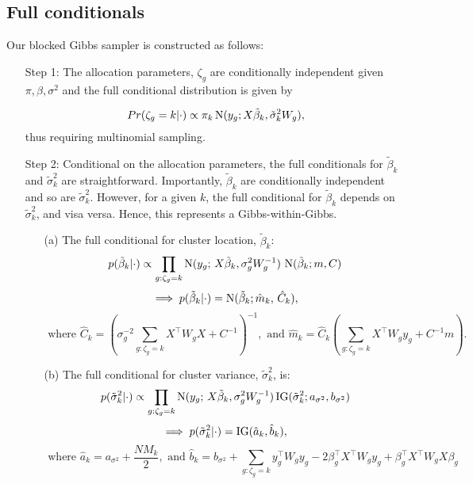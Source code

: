 \subsection{Full conditionals}
\label{subsec:full-cond}
Our blocked Gibbs sampler is constructed as follows:
\begin{enumerate}
\item[Step 1:]
The allocation parameters, $\zeta_g$ are conditionally independent given $\pi, \beta, \sigma^2$ and the full conditional distribution is given by

\begin{equation}
\label{zetafull}
Pr(\zeta_g=k|\cdot) \propto \pi_k \operatorname{N}(y_g;X\tilde{\beta}_k,\tilde{\sigma}_k^2 W_g),
\end{equation}
thus requiring multinomial sampling.

\item[Step 2:] Conditional on the allocation parameters, the full conditionals for $\tilde{\beta}_k$ and $\tilde{\sigma}^2_k$ are straightforward. Importantly, $\tilde{\beta}_k$ are conditionally independent and so are $\tilde{\sigma}^2_k$. However, for a given $k$, the full conditional for $\tilde{\beta}_k$ depends on $\tilde{\sigma}^2_k$, and visa versa. Hence, this represents a Gibbs-within-Gibbs.
  \begin{enumerate}
  \item[(a)] The full conditional for cluster location, $\tilde{\beta}_k$:
    \begin{equation}
      p(\tilde{\beta}_k|\cdot) \propto \prod_{g:\zeta_g=k} \operatorname{N}(y_g;\,X\tilde{\beta}_k, \sigma^2_gW^{-1}_g)\,\operatorname{N}(\tilde{\beta}_k; m, C)
    \end{equation}
    \begin{equation*}
      \implies p(\tilde{\beta}_k|\cdot) = \operatorname{N}(\tilde{\beta}_k; \hat{m}_k,\, \hat{C}_k),
    \end{equation*}
    \begin{equation*}
    \mbox{ where }\hat{C}_k= \left( \sigma^{-2}_g\sum_{g:\zeta_g=k}
      X^\top W_g X + C^{-1} \right)^{-1}, \mbox{ and
    }\hat{m}_k=\hat{C}_k \left(\sum_{g:\zeta_g=k} X^\top W_g y_g +
      C^{-1}m \right).
    \end{equation*}
  \item[(b)] The full conditional for cluster variance, $\tilde{\sigma}_k^2$, is:
    \begin{equation}
      p(\tilde{\sigma}_k^2|\cdot) \propto \prod_{g:\zeta_g=k}
      \operatorname{N}(y_g;\,X\tilde{\beta}_k, \sigma^2_gW^{-1}_g)
      \operatorname{IG}(\tilde{\sigma}_k^2; a_{\sigma^2},b_{\sigma^2})
    \end{equation}
    \begin{equation*}
      \implies p(\tilde{\sigma}_k^2|\cdot) = \operatorname{IG}(\hat{a}_k,\hat{b}_k), 
    \end{equation*}
    \begin{equation*}
      \mbox{ where }\hat{a}_k = a_{\sigma^2} + \frac{NM_k}{2},\mbox{ and }\hat{b}_k= b_{\sigma^2} + \sum_{g:\zeta_g=k}y_g^\top W_g y_g -2 \beta_g^\top X^\top W_g y_g  +\beta_g^\top X^\top W_g X \beta_g
    \end{equation*}


\end{enumerate}
\end{enumerate}
